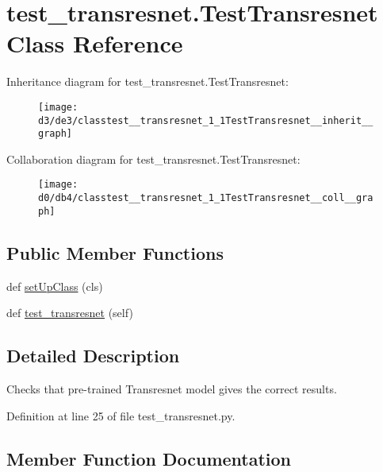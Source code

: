 \hypertarget{classtest__transresnet_1_1TestTransresnet}{}\section{test\+\_\+transresnet.\+Test\+Transresnet Class Reference}
\label{classtest__transresnet_1_1TestTransresnet}


Inheritance diagram for test\+\_\+transresnet.\+Test\+Transresnet\+:\nopagebreak
\begin{figure}[H]
\begin{center}
\leavevmode
\texttt{[image: d3/de3/classtest\_\_transresnet\_1\_1TestTransresnet\_\_inherit\_\_graph]}
\end{center}
\end{figure}


Collaboration diagram for test\+\_\+transresnet.\+Test\+Transresnet\+:\nopagebreak
\begin{figure}[H]
\begin{center}
\leavevmode
\texttt{[image: d0/db4/classtest\_\_transresnet\_1\_1TestTransresnet\_\_coll\_\_graph]}
\end{center}
\end{figure}
\subsection*{Public Member Functions}
\begin{DoxyCompactItemize}
\item 
def \hyperlink{classtest__transresnet_1_1TestTransresnet_aafc17231f7444de8b09ff767920e8f85}{set\+Up\+Class} (cls)
\item 
def \hyperlink{classtest__transresnet_1_1TestTransresnet_a6e1645b6a63146c1757aed9057b44d5e}{test\+\_\+transresnet} (self)
\end{DoxyCompactItemize}


\subsection{Detailed Description}
\begin{DoxyVerb}Checks that pre-trained Transresnet model gives the correct results.
\end{DoxyVerb}
 

Definition at line 25 of file test\+\_\+transresnet.\+py.



\subsection{Member Function Documentation}
\mbox{\label{classtest__transresnet_1_1TestTransresnet_aafc17231f7444de8b09ff767920e8f85}} 
